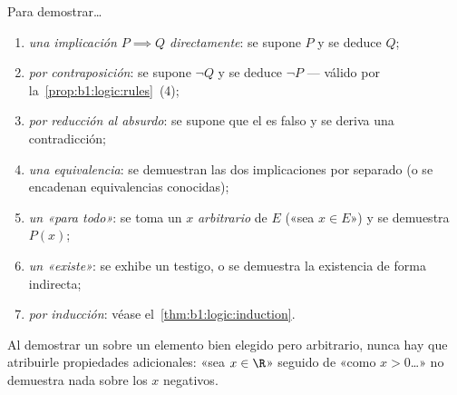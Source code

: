 \begin{method}\label{met:b1:logic:proofs}
Para demostrar\dots
\begin{enumerate}
  \item \emph{una implicación $P \implies Q$ directamente}: se supone
        $P$ y se deduce $Q$;
  \item \emph{por contraposición}: se supone $\lnot Q$ y se deduce
        $\lnot P$ --- válido por la~\cref{prop:b1:logic:rules}~(4);
  \item \emph{por reducción al absurdo}: se supone que el  es
        falso y se deriva una contradicción;
  \item \emph{una equivalencia}: se demuestran las dos implicaciones por
        separado (o se encadenan equivalencias conocidas);
  \item \emph{un  «para todo»}: se toma un $x$
        \emph{arbitrario} de $E$ («sea $x \in E$») y se demuestra $P(x)$;
  \item \emph{un  «existe»}: se exhibe un testigo, o se
        demuestra la existencia de forma indirecta;
  \item \emph{por inducción}: véase el~\cref{thm:b1:logic:induction}.
\end{enumerate}
Al demostrar un  sobre un elemento bien elegido pero
arbitrario, nunca hay que atribuirle propiedades adicionales: «sea
$x \in \R$» seguido de «como $x > 0$\dots» no demuestra nada sobre los
$x$ negativos.
\end{method}

